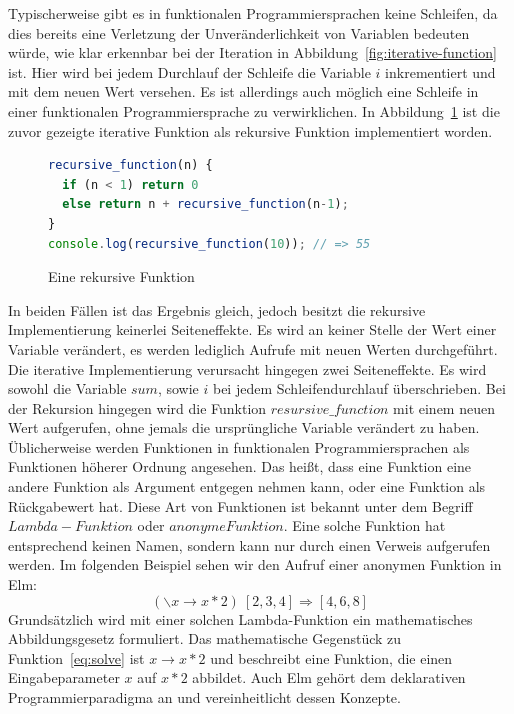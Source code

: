 Typischerweise gibt es in funktionalen Programmiersprachen keine Schleifen, da dies bereits eine Verletzung der Unveränderlichkeit von Variablen bedeuten würde, wie klar erkennbar bei der Iteration in Abbildung~\ref{fig:iterative-function} ist. Hier wird bei jedem Durchlauf der Schleife die Variable $i$ inkrementiert und mit dem neuen Wert versehen. Es ist allerdings auch möglich eine Schleife in einer funktionalen Programmiersprache zu verwirklichen. In Abbildung~\ref{fig:recursive-function} ist die zuvor gezeigte iterative Funktion als rekursive Funktion implementiert worden.
\begin{figure}[hb]
\begin{lstlisting}[language=JavaScript]
recursive_function(n) {
  if (n < 1) return 0
  else return n + recursive_function(n-1);
}
console.log(recursive_function(10)); // => 55
\end{lstlisting}
\caption{Eine rekursive Funktion}\label{fig:recursive-function}
\end{figure}
In beiden Fällen ist das Ergebnis gleich, jedoch besitzt die rekursive Implementierung keinerlei Seiteneffekte. Es wird an keiner Stelle der Wert einer Variable verändert, es werden lediglich Aufrufe mit neuen Werten durchgeführt. Die iterative Implementierung verursacht hingegen zwei Seiteneffekte. Es wird sowohl die Variable $sum$, sowie $i$ bei jedem Schleifendurchlauf überschrieben. Bei der Rekursion hingegen wird  die Funktion $resursive\_function$
mit einem neuen Wert aufgerufen, ohne jemals die ursprüngliche Variable verändert zu haben.
Üblicherweise werden Funktionen in funktionalen Programmiersprachen als Funktionen höherer Ordnung angesehen. Das heißt, dass eine Funktion eine andere Funktion als Argument entgegen nehmen kann, oder eine Funktion als Rückgabewert hat. Diese Art von Funktionen ist bekannt unter dem Begriff $Lambda-Funktion$ oder $anonyme Funktion$. Eine solche Funktion hat entsprechend keinen Namen, sondern kann nur durch einen Verweis aufgerufen werden. Im folgenden Beispiel sehen wir den Aufruf einer anonymen Funktion in Elm:
\begin{equation} \label{eq:solve}
(\backslash x \rightarrow x * 2)\ [ 2, 3, 4 ] \Longrightarrow [4, 6, 8]
\end{equation}
Grundsätzlich wird mit einer solchen Lambda-Funktion ein mathematisches Abbildungsgesetz formuliert. Das mathematische Gegenstück zu Funktion~\ref{eq:solve} ist $x \rightarrow x * 2$ und beschreibt eine Funktion, die einen Eingabeparameter $x$ auf $x*2$ abbildet. Auch Elm gehört dem deklarativen Programmierparadigma an und vereinheitlicht dessen Konzepte.


